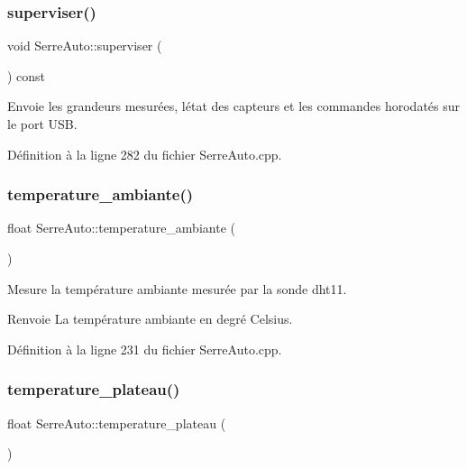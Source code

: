 \subsubsection{superviser()}
{\footnotesize\ttfamily void Serre\+Auto\+::superviser (\begin{DoxyParamCaption}{ }\end{DoxyParamCaption}) const}



Envoie les grandeurs mesurées, l\textquotesingle{}état des capteurs et les commandes horodatés sur le port U\+SB. 



Définition à la ligne 282 du fichier Serre\+Auto.\+cpp.

\mbox{\label{class_serre_auto_a2899f09ed5ddbec61814730d4887ecfa}} 
\subsubsection{temperature\+\_\+ambiante()}
{\footnotesize\ttfamily float Serre\+Auto\+::temperature\+\_\+ambiante (\begin{DoxyParamCaption}{ }\end{DoxyParamCaption})}



Mesure la température ambiante mesurée par la sonde dht11. 

\begin{DoxyReturn}{Renvoie}
La température ambiante en degré Celsius. 
\end{DoxyReturn}


Définition à la ligne 231 du fichier Serre\+Auto.\+cpp.

\mbox{\label{class_serre_auto_aa363dbb076e6558e326db9a53b90abe4}} 
\subsubsection{temperature\+\_\+plateau()}
{\footnotesize\ttfamily float Serre\+Auto\+::temperature\+\_\+plateau (\begin{DoxyParamCaption}{ }\end{DoxyParamCaption})}



